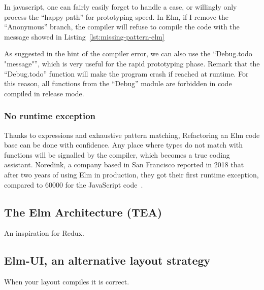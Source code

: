 

In javascript, one can fairly easily forget to handle a case,
or willingly only process the ``happy path'' for prototyping speed.
In Elm, if I remove the ``Anonymous'' branch,
the compiler will refuse to compile the code
with the message showed in Listing~\ref{lst:missing-pattern-elm}



As suggested in the hint of the compiler error,
we can also use the ``Debug.todo "message"'',
which is very useful for the rapid prototyping phase.
Remark that the ``Debug.todo'' function will make the program crash
if reached at runtime.
For this reason, all functions from the ``Debug'' module
are forbidden in code compiled in release mode.


\subsubsection{No runtime exception}%
\label{ssub:no_runtime_exception}

Thanks to expressions and exhaustive pattern matching,
Refactoring an Elm code base can be done with confidence.
Any place where types do not match with functions
will be signalled by the compiler, which becomes a true coding assistant.
Noredink, a company based in San Francisco reported in 2018 that after
two years of using Elm in production,
they got their first runtime exception,
compared to 60000 for the JavaScript code~\cite{zeroruntimeerror}.


\subsection{The Elm Architecture (TEA)}%
\label{sub:the_elm_architecture_tea_}

An inspiration for Redux.

\subsection{Elm-UI, an alternative layout strategy}%
\label{sub:elm_ui_an_alternative_layout_strategy}

When your layout compiles it is correct.
